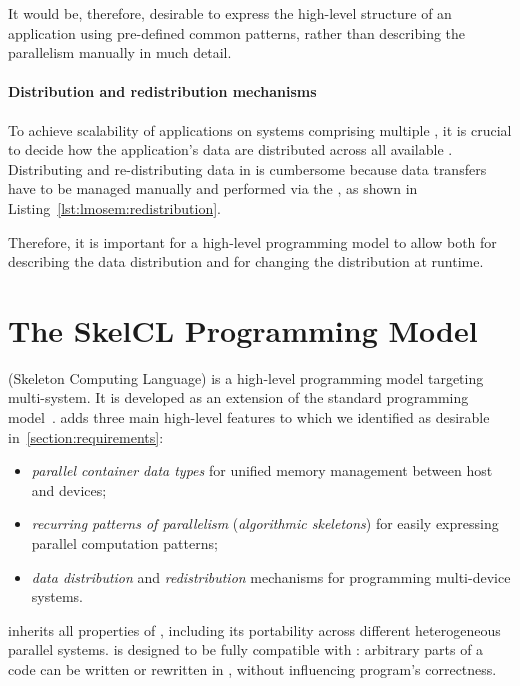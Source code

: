 It would be, therefore, desirable to express the high-level structure of an application using pre-defined common patterns, rather than describing the parallelism manually in much detail.

\paragraph{Distribution and redistribution mechanisms}
To achieve scalability of applications on systems comprising multiple \GPUs, it is crucial to decide how the application's data are distributed across all available \GPUs.
Distributing and re-distributing data in \OpenCL is cumbersome because data transfers have to be managed manually and performed via the \CPU, as shown in Listing~\ref{lst:lmosem:redistribution}.

Therefore, it is important for a high-level programming model to allow both for describing the data distribution and for changing the distribution at runtime.


\section{The SkelCL Programming Model}
\label{section:skelcl-programming-model}
\SkelCL (Skeleton Computing Language) is a high-level programming model targeting multi-\GPU system.
It is developed as an extension of the standard \OpenCL programming model~\cite{OpenCL}.
\SkelCL adds three main high-level features to \OpenCL which we identified as desirable in~\autoref{section:requirements}:

\begin{itemize}
  \item \emph{parallel container data types} for unified memory management between host and devices;
  \item \emph{recurring patterns of parallelism} (\aka \emph{algorithmic skeletons}) for easily expressing parallel computation patterns;
  \item \emph{data distribution} and \emph{redistribution} mechanisms for programming multi-device systems.
\end{itemize}

\noindent
\SkelCL inherits all properties of \OpenCL, including its portability across different heterogeneous parallel systems.
\SkelCL is designed to be fully compatible with \OpenCL: arbitrary parts of a \SkelCL code can be written or rewritten in \OpenCL, without influencing program's correctness.

